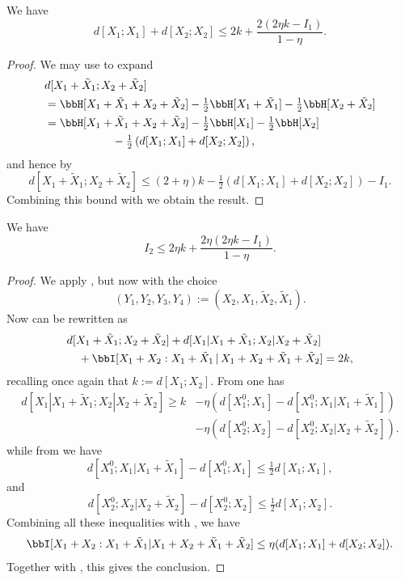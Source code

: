 \begin{lemma}\label{second-estimate-aux}\leanok
We have
\[d[X_1;X_1] + d[X_2;X_2] \leq 2 k + \frac{2(2 \eta k - I_1)}{1-\eta}. \]
\end{lemma}
\begin{proof}
  \leanok
We may use  to expand
  \begin{align*}
   & d[X_1+\tilde X_1;X_2+\tilde X_2] \\ &= \bbH[X_1+\tilde X_1 + X_2 + \tilde X_2]  - \tfrac{1}{2} \bbH[X_1+\tilde X_1] - \tfrac{1}{2} \bbH[X_2+\tilde X_2] \\
    &= \bbH[X_1+\tilde X_1 + X_2 + \tilde X_2]  - \tfrac{1}{2} \bbH[X_1] - \tfrac{1}{2} \bbH[X_2]  \\ & \qquad\qquad\qquad   - \tfrac{1}{2} \left( d[X_1;X_1] + d[X_2; X_2] \right),
  \end{align*}
  and hence by 
  \[
    d[X_1+\tilde X_1; X_2+\tilde X_2] \leq (2+\eta) k - \tfrac{1}{2} \left( d[X_1;X_1] + d[X_2;X_2] \right) - I_1.
  \]
  Combining this bound with  we obtain
  the result.
\end{proof}

\begin{lemma}\label{second-estimate}
  \leanok
We have
$$ I_2 \leq 2 \eta k + \frac{2 \eta (2 \eta k - I_1)}{1 - \eta}.$$
\end{lemma}

\begin{proof}
  \leanok
  We apply , but now with the choice
  \[
    (Y_1,Y_2,Y_3,Y_4) := (X_2, X_1, \tilde X_2, \tilde X_1).
  \]
  Now  can be rewritten as
  \begin{align*}
    &d[X_1+\tilde X_1;X_2+\tilde X_2] + d[X_1|X_1+\tilde X_1; X_2|X_2+\tilde X_2] \\
    &\quad + \bbI[X_1+X_2 : X_1 + \tilde X_1 \,|\, X_1+X_2+\tilde X_1+\tilde X_2] = 2k,
  \end{align*}
  recalling once again that $k := d[X_1;X_2]$.  From  one has
  \begin{align*}
    d[X_1|X_1+\tilde X_1; X_2|X_2+\tilde X_2]   \geq k &- \eta (d[X^0_1;X_1] - d[X^0_1;X_1|X_1+\tilde X_1]) \\& - \eta (d[X^0_2;X_2] - d[X^0_2;X_2|X_2+\tilde X_2]) .
  \end{align*}
  while from  we have
  \[
    d[X^0_1;X_1|X_1+\tilde X_1] -  d[X^0_1;X_1] \leq  \tfrac{1}{2} d[X_1;X_1],
  \]
  and
  \[
    d[X^0_2;X_2|X_2+\tilde X_2] -  d[X^0_2;X_2] \leq \tfrac{1}{2} d[X_1;X_2].
    \]
  Combining all these inequalities with , we have
  \begin{equation}\label{combined}
  \bbI[X_1+X_2 : X_1 + \tilde X_1 | X_1+X_2+\tilde X_1+\tilde X_2] \leq \eta ( d[X_1; X_1] + d[X_2; X_2] ).
  \end{equation}
  Together with , this gives the conclusion.
\end{proof}


